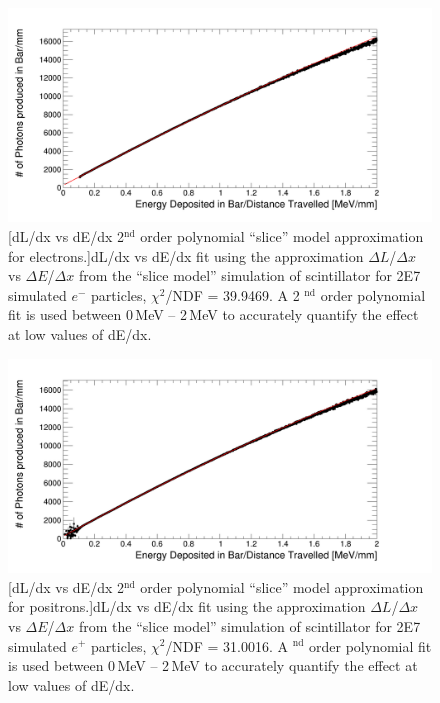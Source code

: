 \begin{figure}[htbp]
 \centering
 \includegraphics[width=\linewidth]{Appendix4/Figs/newNewDldxVsDeDx/e-_dedxVsdldxFitFine.png}
 [dL/dx vs dE/dx 2$^\textrm{nd}$ order polynomial ``slice'' model approximation for electrons.]{dL/dx vs dE/dx fit using the approximation $\Delta L$/$\Delta x$ vs $\Delta E$/$\Delta x$ from the ``slice model'' simulation of scintillator for 2E7 simulated $e^-$ particles, $\chi^2$/NDF = 39.9469. A 2 $^\textrm{nd}$ order polynomial fit is used between 0\,MeV -- 2\,MeV to accurately quantify the effect at low values of dE/dx. } 
 \label{fig:slice_Electron_fine_dl_dx}
\end{figure}

\begin{figure}[htbp]
 \centering
 \includegraphics[width=\linewidth]{Appendix4/Figs/newNewDldxVsDeDx/e+_dedxVsdldxFitFine.png}
 [dL/dx vs dE/dx 2$^\textrm{nd}$ order polynomial ``slice'' model approximation for positrons.]{dL/dx vs dE/dx fit using the approximation $\Delta L$/$\Delta x$ vs $\Delta E$/$\Delta x$ from the ``slice model'' simulation of scintillator for 2E7 simulated $e^+$ particles, $\chi^2$/NDF = 31.0016. A $^\textrm{nd}$ order polynomial fit is used between 0\,MeV -- 2\,MeV to accurately quantify the effect at low values of dE/dx.} 
 \label{fig:slice_Positron_fine_dl_dx}
\end{figure}
